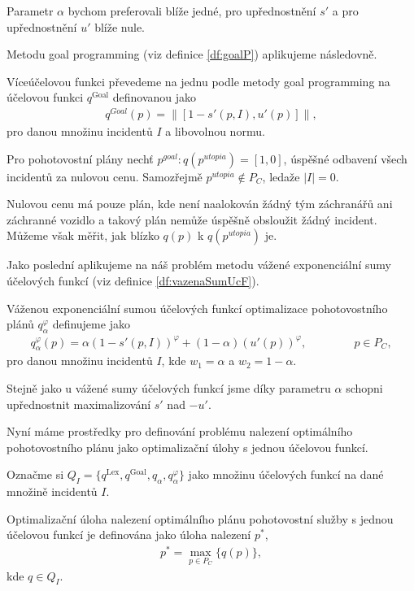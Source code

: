 Parametr $\alpha$ bychom preferovali blíže jedné, pro upřednostnění $s'$ a pro upřednostnění $u'$ blíže nule.

Metodu goal programming (viz definice \ref{df:goalP}) aplikujeme následovně.
\begin{definice}
  Víceúčelovou funkci převedeme na jednu podle metody goal programming na účelovou funkci $q^{\text{Goal}}$ definovanou jako
  \begin{align*}
    q^{Goal}(p) = \| [1 - s'(p, I), u'(p)] \|,
  \end{align*}
  pro danou množinu incidentů $I$ a libovolnou normu.
\end{definice}

Pro pohotovostní plány nechť $p^{goal} \colon q(p^{utopia}) = [1, 0]$, úspěšné odbavení všech incidentů za nulovou cenu.
Samozřejmě $p^{utopia} \not \in P_C$, ledaže $|I| = 0$.

Nulovou cenu má pouze plán, kde není naalokován žádný tým záchranářů ani záchranné vozidlo a takový plán nemůže úspěšně obsloužit žádný incident. 
Můžeme však měřit, jak blízko $q(p)$ k $q(p^{utopia})$ je.

Jako poslední aplikujeme na náš problém metodu vážené exponenciální sumy účelových funkcí (viz definice \ref{df:vazenaSumUcF}).
\begin{definice}\label{df:vazenaSumaExpPohotovost}
  Váženou exponenciální sumou účelových funkcí optimalizace pohotovostního plánů $q_{\alpha}^{\varphi}$ definujeme jako 
  \begin{align*}
    q_{\alpha}^{\varphi}(p) = \alpha (1 - s'(p, I))^\varphi + (1 - \alpha)(u'(p))^\varphi, \hspace{50pt} p \in P_C,
  \end{align*}
  pro danou množinu incidentů $I$, kde $w_1 = \alpha$ a $w_2 = 1 - \alpha$.
\end{definice}

Stejně jako u vážené sumy účelových funkcí jsme díky parametru $\alpha$ schopni upřednostnit maximalizování $s'$ nad $-u'$.

Nyní máme prostředky pro definování problému nalezení optimálního pohotovostního plánu jako optimalizační úlohy s jednou účelovou funkcí.

Označme si $Q_I = \{ q^{\text{Lex}}, q^{\text{Goal}}, q_{\alpha}, q_{\alpha}^{\varphi}\}$ jako množinu účelových funkcí na dané množině incidentů $I$.
\begin{definice}\label{df:optUloha1uc}
  Optimalizační úloha nalezení optimálního plánu pohotovostní služby s jednou účelovou funkcí je definována jako úloha nalezení $p^*$,
  \begin{align}
    p^* = \max_{p \in P_C} \{ q(p) \},
  \end{align}
  kde $q \in Q_I$.
\end{definice}

